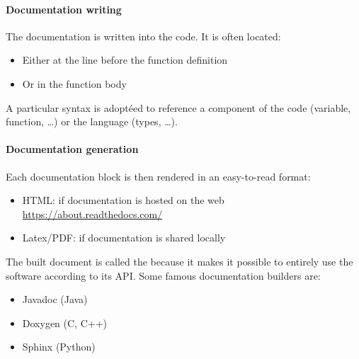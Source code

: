 \documentclass[11pt]{article}
\begin{document}
				\paragraph{Documentation writing}
					The documentation is written into the code. It is often located:
					\begin{itemize}
							\setlength\itemsep{0pt}
							\item Either at the line before the function definition
							\item Or in the function body
					\end{itemize}
					A particular syntax is adoptéed to reference a component of the code (variable, function, \ldots) or the language (types, \ldots).

				\paragraph{Documentation generation}
					Each documentation block is then rendered in an easy-to-read format:
					\begin{itemize}
							\setlength\itemsep{0pt}
							\item HTML: if documentation is hosted on the web \url{https://about.readthedocs.com/}
							\item Latex/PDF: if documentation is shared locally
					\end{itemize}
					The built document is called the  because it makes it possible to entirely use the software according to its API.
					Some famous documentation builders are:
					\begin{itemize}
							\setlength\itemsep{0pt}
							\item Javadoc (Java)
							\item Doxygen (C, C++)
							\item Sphinx (Python)
					\end{itemize}
\end{document}
